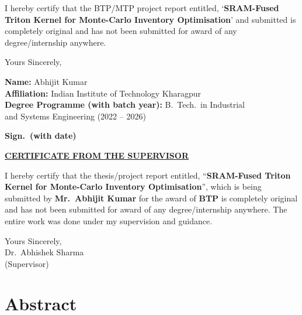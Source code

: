 \documentclass[11pt, a4paper, oneside]{report}
\begin{document}
\vspace{1.5cm}

\noindent I hereby certify that the BTP/MTP project report entitled, `\textbf{SRAM-Fused Triton Kernel for Monte-Carlo Inventory Optimisation}' and submitted is completely original and has not been submitted for award of any degree/internship anywhere.

\vspace{4cm}

\noindent Yours Sincerely,

\vspace{1.5cm}

\noindent\textbf{Name:} Abhijit Kumar\\[0.3cm]
\textbf{Affiliation:} Indian Institute of Technology Kharagpur\\[0.3cm]
\textbf{Degree Programme (with batch year):} B.\ Tech.\ in Industrial\\
and Systems Engineering (2022 -- 2026)

\vspace{2cm}

\hfill\textbf{Sign.\ (with date)}

\newpage
\thispagestyle{empty}

\begin{center}
{\Large\bfseries\underline{CERTIFICATE FROM THE SUPERVISOR}}
\end{center}

\vspace{1.5cm}

\noindent I hereby certify that the thesis/project report entitled, ``\textbf{SRAM-Fused Triton Kernel for Monte-Carlo Inventory Optimisation}'', which is being submitted by \textbf{Mr.\ Abhijit Kumar} for the award of \textbf{BTP} is completely original and has not been submitted for award of any degree/internship anywhere. The entire work was done under my supervision and guidance.

\vspace{6cm}

\noindent Yours Sincerely,\\
Dr.\ Abhishek Sharma\\
(Supervisor)

\chapter*{Abstract}

\end{document}
